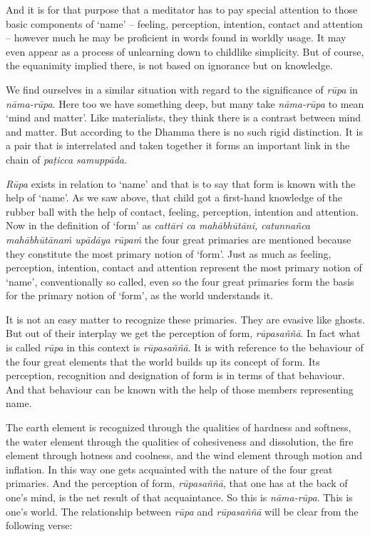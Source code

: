 And it is for that purpose that a meditator has to pay special attention to those basic components of `name' -- feeling, perception, intention, contact and attention -- however much he may be proficient in words found in worldly usage. It may even appear as a process of unlearning down to childlike simplicity. But of course, the equanimity implied there, is not based on ignorance but on knowledge.

We find ourselves in a similar situation with regard to the significance of \emph{rūpa} in \emph{nāma-rūpa}. Here too we have something deep, but many take \emph{nāma-rūpa} to mean `mind and matter'. Like materialists, they think there is a contrast between mind and matter. But according to the Dhamma there is no such rigid distinction. It is a pair that is interrelated and taken together it forms an important link in the chain of \emph{paṭicca samuppāda}.

\emph{Rūpa} exists in relation to `name' and that is to say that form is known with the help of `name'. As we saw above, that child got a first-hand knowledge of the rubber ball with the help of contact, feeling, perception, intention and attention. Now in the definition of `form' as \emph{cattāri ca mahābhūtāni, catunnañca mahābhūtānaṁ upādāya rūpaṁ} the four great primaries are mentioned because they constitute the most primary notion of `form'. Just as much as feeling, perception, intention, contact and attention represent the most primary notion of `name', conventionally so called, even so the four great primaries form the basis for the primary notion of `form', as the world understands it.

It is not an easy matter to recognize these primaries. They are evasive like ghosts. But out of their interplay we get the perception of form, \emph{rūpasaññā}. In fact what is called \emph{rūpa} in this context is \emph{rūpasaññā}. It is with reference to the behaviour of the four great elements that the world builds up its concept of form. Its perception, recognition and designation of form is in terms of that behaviour. And that behaviour can be known with the help of those members representing name.

The earth element is recognized through the qualities of hardness and softness, the water element through the qualities of cohesiveness and dissolution, the fire element through hotness and coolness, and the wind element through motion and inflation. In this way one gets acquainted with the nature of the four great primaries. And the perception of form, \emph{rūpasaññā}, that one has at the back of one's mind, is the net result of that acquaintance. So this is \emph{nāma-rūpa}. This is one's world. The relationship between \emph{rūpa} and \emph{rūpasaññā} will be clear from the following verse:

